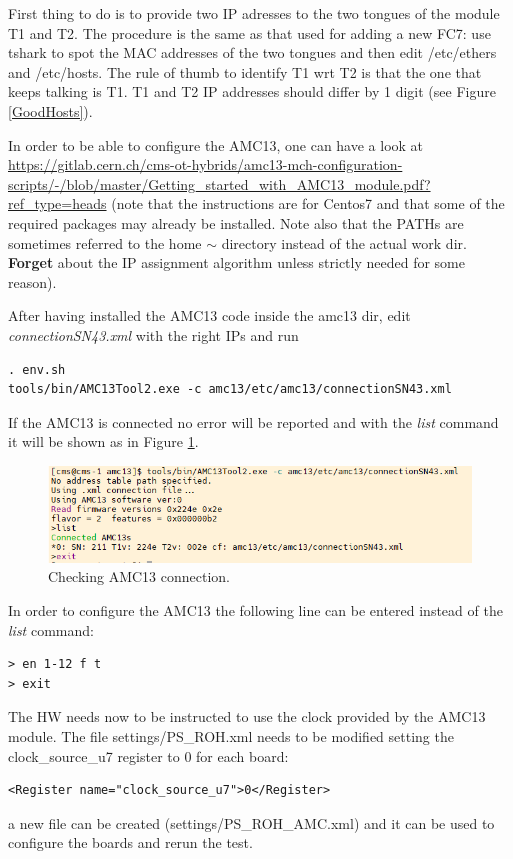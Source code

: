\documentclass[10pt,a4paper]{article}
\begin{document}
First thing to do is to provide two IP adresses to the two tongues of the module T1 and T2. The procedure is the same as that used for adding a new FC7: use tshark to spot the MAC addresses of the two tongues and then edit /etc/ethers and /etc/hosts. The rule of thumb to identify T1 wrt T2 is that the one that keeps talking is T1. T1 and T2 IP addresses should differ by 1 digit (see Figure \ref{GoodHosts}).

In order to be able to configure the AMC13, one can have a look at \\
\url{https://gitlab.cern.ch/cms-ot-hybrids/amc13-mch-configuration-scripts/-/blob/master/Getting_started_with_AMC13_module.pdf?ref_type=heads} 
 (note that the instructions are for Centos7 and that some of the required packages may already be installed. Note also that the PATHs are sometimes referred to the home $\sim$ directory instead of the actual work dir. {\bf Forget} about the IP assignment algorithm unless strictly needed for some reason). 

After having installed the AMC13 code inside the amc13 dir, edit {\it connectionSN43.xml} with the right IPs and run 
\begin{framed}
\begin{verbatim}
. env.sh
tools/bin/AMC13Tool2.exe -c amc13/etc/amc13/connectionSN43.xml
\end{verbatim}
\end{framed}
If the AMC13 is connected no error will be reported and with the {\it list} command it will be shown as in Figure \ref{amc13connected}.
\begin{figure}[h!]
\centering
 \includegraphics[width=\linewidth]{amc13connected.png} 
  \caption{Checking AMC13 connection.}
\label{amc13connected}
\end{figure}
In order to configure the AMC13 the following line can be entered instead of the {\it list} command:
\begin{framed}
\begin{verbatim}
> en 1-12 f t
> exit
\end{verbatim}
\end{framed}

The HW needs now to be instructed to use the clock provided by the AMC13 module. The file settings/PS\_ROH.xml needs to be modified setting the clock\_source\_u7 register to 0 for each board:
\begin{framed}
\begin{verbatim}
<Register name="clock_source_u7">0</Register>
\end{verbatim}
\end{framed}
a new file can be created (settings/PS\_ROH\_AMC.xml) and it can be used to configure the boards and rerun the test.
\end{document}
